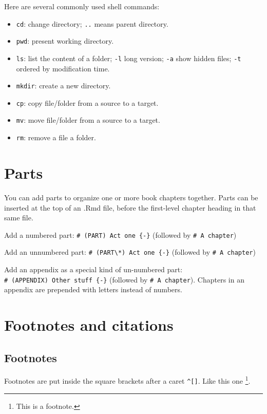 \documentclass[
]{book}
\providecommand{\tightlist}{%
  \setlength{\itemsep}{0pt}\setlength{\parskip}{0pt}}
\theoremstyle{definition}
\theoremstyle{definition}
\theoremstyle{definition}
\theoremstyle{definition}
\theoremstyle{remark}
\begin{document}
Here are several commonly used shell commands:

\begin{itemize}
\tightlist
\item
  \texttt{cd}: change directory; \texttt{..} means parent directory.
\item
  \texttt{pwd}: present working directory.
\item
  \texttt{ls}: list the content of a folder; \texttt{-l} long version;
  \texttt{-a} show hidden files; \texttt{-t} ordered by modification time.
\item
  \texttt{mkdir}: create a new directory.
\item
  \texttt{cp}: copy file/folder from a source to a target.
\item
  \texttt{mv}: move file/folder from a source to a target.
\item
  \texttt{rm}: remove a file a folder.
\end{itemize}

\chapter{Parts}\label{parts}

You can add parts to organize one or more book chapters together. Parts can be inserted at the top of an .Rmd file, before the first-level chapter heading in that same file.

Add a numbered part: \texttt{\#\ (PART)\ Act\ one\ \{-\}} (followed by \texttt{\#\ A\ chapter})

Add an unnumbered part: \texttt{\#\ (PART\textbackslash{}*)\ Act\ one\ \{-\}} (followed by \texttt{\#\ A\ chapter})

Add an appendix as a special kind of un-numbered part: \texttt{\#\ (APPENDIX)\ Other\ stuff\ \{-\}} (followed by \texttt{\#\ A\ chapter}). Chapters in an appendix are prepended with letters instead of numbers.

\chapter{Footnotes and citations}\label{footnotes-and-citations}

\section{Footnotes}\label{footnotes}

Footnotes are put inside the square brackets after a caret \texttt{\^{}{[}{]}}. Like this one \footnote{This is a footnote.}.
\end{document}
